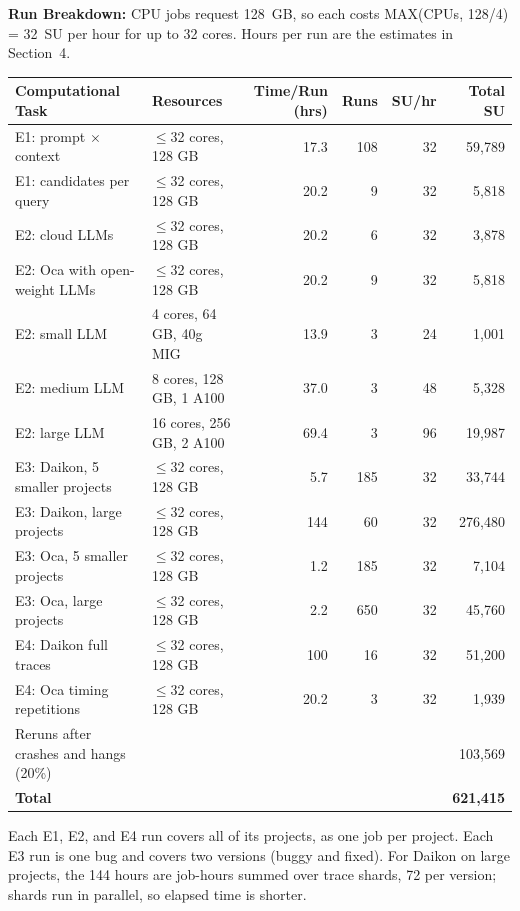 \documentclass{article}
\begin{document}
\textbf{Run Breakdown:} CPU jobs request 128~GB, so each costs MAX(CPUs, 128/4) = 32~SU per hour for up to 32 cores.
Hours per run are the estimates in Section~4.
\begin{center}
\footnotesize\setlength{\tabcolsep}{4pt}
\begin{tabular}{|l|l|r|r|r|r|}
\toprule
\textbf{Computational Task} & \textbf{Resources} & \textbf{Time/Run (hrs)} & \textbf{Runs} & \textbf{SU/hr} & \textbf{Total SU} \\
\midrule
E1: prompt $\times$ context & $\le$32 cores, 128 GB & 17.3 & 108 & 32 & 59,789 \\
E1: candidates per query & $\le$32 cores, 128 GB & 20.2 & 9 & 32 & 5,818 \\
E2: cloud LLMs & $\le$32 cores, 128 GB & 20.2 & 6 & 32 & 3,878 \\
E2: Oca with open-weight LLMs & $\le$32 cores, 128 GB & 20.2 & 9 & 32 & 5,818 \\
E2: small LLM & 4 cores, 64 GB, 40g MIG & 13.9 & 3 & 24 & 1,001 \\
E2: medium LLM & 8 cores, 128 GB, 1 A100 & 37.0 & 3 & 48 & 5,328 \\
E2: large LLM & 16 cores, 256 GB, 2 A100 & 69.4 & 3 & 96 & 19,987 \\
E3: Daikon, 5 smaller projects & $\le$32 cores, 128 GB & 5.7 & 185 & 32 & 33,744 \\
E3: Daikon, large projects & $\le$32 cores, 128 GB & 144 & 60 & 32 & 276,480 \\
E3: Oca, 5 smaller projects & $\le$32 cores, 128 GB & 1.2 & 185 & 32 & 7,104 \\
E3: Oca, large projects & $\le$32 cores, 128 GB & 2.2 & 650 & 32 & 45,760 \\
E4: Daikon full traces & $\le$32 cores, 128 GB & 100 & 16 & 32 & 51,200 \\
E4: Oca timing repetitions & $\le$32 cores, 128 GB & 20.2 & 3 & 32 & 1,939 \\
Reruns after crashes and hangs (20\%) & & & & & 103,569 \\
\midrule
\textbf{Total} & & & & & \textbf{621,415} \\
\bottomrule
\end{tabular}
\end{center}
Each E1, E2, and E4 run covers all of its projects, as one job per project.
Each E3 run is one bug and covers two versions (buggy and fixed).
For Daikon on large projects, the 144 hours are job-hours summed over trace shards, 72 per version; shards run in parallel, so elapsed time is shorter.
\end{document}
